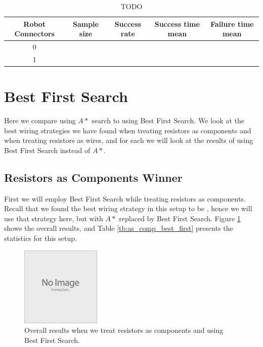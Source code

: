 \begin{table}[H]
\begin{center}
\begin{singlespace}
\begin{tabular}{| c | c | c | c | c |}
\hline
Robot Connectors & Sample size & Success rate & Success time mean &
Failure time mean\\
\hline\hline
0 & & & & \\
1 & & & & \\
\hline
\end{tabular}
\end{singlespace}
\end{center}
\label{tb:TODO}
\caption{TODO}
\end{table}

\section{Best First Search}

Here we compare using $A*$ search to using Best First Search. We look at the
best wiring strategies we have found when treating resistors as components and
when treating resistors as wires, and for each we will look at the results of
using Best First Search instead of $A*$.

\subsection{Resistors as Components Winner}

First we will employ Best First Search while treating resistors as components.
Recall
that we found the best wiring strategy in this setup to be \q, hence we will use
that strategy here, but with $A*$ replaced by Best First Search. Figure
\ref{fig:as_comp_best_first} shows the overall results, and Table
\ref{tb:as_comp_best_first} presents the statistics for this setup.

\begin{figure}[H]
\begin{center}
\includegraphics{Images/placeholder.jpg}
\caption{Overall results when we treat resistors as components and \q using Best
First Search.}
\label{fig:as_comp_best_first}
\end{center}
\end{figure}


